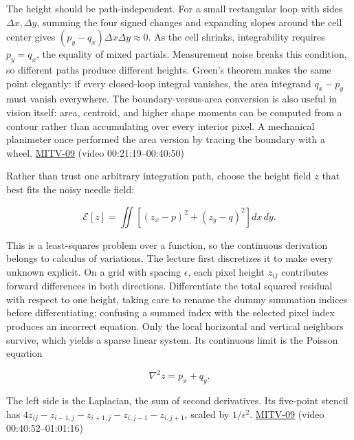 The height should be path-independent. For a small rectangular loop with sides \(\Delta x,\Delta y\), summing the four signed changes and expanding slopes around the cell center gives \((p_y-q_x)\Delta x\Delta y\approx0\). As the cell shrinks, integrability requires \(p_y=q_x\), the equality of mixed partials. Measurement noise breaks this condition, so different paths produce different heights. Green's theorem makes the same point elegantly: if every closed-loop integral vanishes, the area integrand \(q_x-p_y\) must vanish everywhere. The boundary-versus-area conversion is also useful in vision itself: area, centroid, and higher shape moments can be computed from a contour rather than accumulating over every interior pixel. A mechanical planimeter once performed the area version by tracing the boundary with a wheel. \hyperref[04-visual-computing-ii-ch036-mitv-09---shape-from-shading-general-case---from-first-order-nonlinear-pde-to-five-odes]{MITV-09} (video 00:21:19--00:40:50)

Rather than trust one arbitrary integration path, choose the height field \(z\) that best fits the noisy needle field:

\[
\mathcal E[z]=\iint\left[(z_x-p)^2+(z_y-q)^2\right]dx\,dy.
\]

This is a least-squares problem over a function, so the continuous derivation belongs to calculus of variations. The lecture first discretizes it to make every unknown explicit. On a grid with spacing \(\epsilon\), each pixel height \(z_{ij}\) contributes forward differences in both directions. Differentiate the total squared residual with respect to one height, taking care to rename the dummy summation indices before differentiating; confusing a summed index with the selected pixel index produces an incorrect equation. Only the local horizontal and vertical neighbors survive, which yields a sparse linear system. Its continuous limit is the Poisson equation

\[
\nabla^2 z=p_x+q_y.
\]

The left side is the Laplacian, the sum of second derivatives. Its five-point stencil has \(4z_{ij}-z_{i-1,j}-z_{i+1,j}-z_{i,j-1}-z_{i,j+1}\), scaled by \(1/\epsilon^2\). \hyperref[04-visual-computing-ii-ch036-mitv-09---shape-from-shading-general-case---from-first-order-nonlinear-pde-to-five-odes]{MITV-09} (video 00:40:52--01:01:16)


